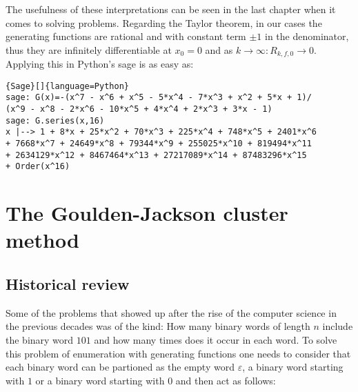 \documentclass[12pt]{report}
\begin{document}
{\noindent The usefulness of these interpretations can be seen in the last chapter when it comes to solving problems. Regarding the Taylor theorem, in our cases the generating functions are rational and with constant term $\pm 1$ in the denominator, thus they are infinitely differentiable at $x_0 = 0$ and as $k\rightarrow \infty : R_{k,f,0}\rightarrow 0$. Applying this in Python's sage is as easy as:

{{
\begin{lstlisting}{Sage}[]{language=Python}
sage: G(x)=-(x^7 - x^6 + x^5 - 5*x^4 - 7*x^3 + x^2 + 5*x + 1)/
(x^9 - x^8 - 2*x^6 - 10*x^5 + 4*x^4 + 2*x^3 + 3*x - 1)
sage: G.series(x,16)
x |--> 1 + 8*x + 25*x^2 + 70*x^3 + 225*x^4 + 748*x^5 + 2401*x^6 
+ 7668*x^7 + 24649*x^8 + 79344*x^9 + 255025*x^10 + 819494*x^11 
+ 2634129*x^12 + 8467464*x^13 + 27217089*x^14 + 87483296*x^15 
+ Order(x^16)
\end{lstlisting}
}

\chapter{The Goulden-Jackson cluster method}

\section{Historical review}

Some of the problems that showed up after the rise of the computer science in the previous decades was of the kind: How many binary words of length $n$ include the binary word $101$ and how many times does it occur in each word. To solve this problem of enumeration with generating functions one needs to consider that each binary word can be partioned as the empty word $\varepsilon$, a binary word starting with $1$ or a binary word starting with $0$ and then act as follows:

}}
\end{document}
